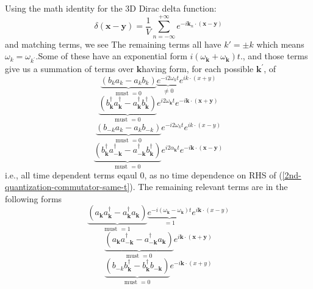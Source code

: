 Using the math identity for the 3D Dirac delta function:
\begin{equation}
\delta(\mathbf{x}-\mathbf{y})=\frac{1}{V} \sum_{n=-\infty}^{+\infty} e^{-i \mathbf{k}_{n} \cdot(\mathbf{x}-\mathbf{y})}
\label{3D-dirac-idneityt}
\end{equation}
and matching terms, we see  The remaining terms all have $k'=\pm k$ which means $\omega_{k}=\omega_{k^{\prime}}$.Some of these have an exponential form $i\left(\omega_{\mathbf{k}}+\omega_{\mathbf{k}}\right) t.$, and those terms give us a summation of terms over $\mathbf{k} $having form, for each possible $\mathbf{k}^{\prime}$, of
$$
\underbrace{\left(b_{k} a_{k}-a_{k} b_{k}\right)}_{\text {must }=0}\underbrace{e^{-i 2 \omega_{k} t}}_{\neq 0} e^{i k \cdot(x+y)}
$$
$$
\underbrace{\left(b_{\mathbf{k}}^{\dagger} a_{\mathbf{k}}^{\dagger}-a_{\mathbf{k}}^{\dagger} b_{\mathbf{k}}^{\dagger}\right)}_{\text {must }=0} e^{i 2 \omega_{\mathbf{k}} t} e^{-i \mathbf{k} \cdot(\mathbf{x}+\mathbf{y})}
$$
$$
\underbrace{\left(b_{-k} a_{k}-a_{k} b_{-k}\right)}_{\text {must }=0} e^{-i 2 \omega_{k} t} e^{i k \cdot(x-y)}
$$
$$
\underbrace{\left(b_{\mathbf{k}}^{\dagger} a_{-\mathbf{k}}^{\dagger}-a_{-\mathbf{k}}^{\dagger} b_{\mathbf{k}}^{\dagger}\right)}_{\text {must }=0} e^{i 2 \alpha_{\mathbf{k}} t} e^{-i \mathbf{k} \cdot(\mathbf{x}-\mathbf{y})}
$$
i.e., all time dependent terms eqaul 0, as no time dependence on RHS of (\ref{2nd-quantization-commutator-same-t}). The remaining relevant terms are in the following forms
$$
\underbrace{\left(a_{\mathbf{k}} a_{\mathbf{k}}^{\dagger}-a_{\mathbf{k}}^{\dagger} a_{\mathbf{k}}\right)}_{\text {must }=1} \underbrace{e^{-i\left(\omega_{\mathbf{k}}-\omega_{\mathbf{k}}\right) t}}_{=1}e^{i \mathbf{k} \cdot(x-y)}
$$
$$
\underbrace{\left(a_{\mathbf{k}} a_{-\mathbf{k}}^{\dagger}-a_{-\mathbf{k}}^{\dagger} a_{\mathbf{k}}\right)}_{\text {must }=0} e^{i \mathbf{k} \cdot(\mathbf{x}+\mathbf{y})}
$$
$$
\underbrace{\left(b_{-k} b_{\mathbf{k}}^{\dagger}-b_{\mathbf{k}}^{\dagger} b_{-\mathbf{k}}\right)}_{\text {must }=0} e^{-i \mathbf{k} \cdot(x+y)}
$$
